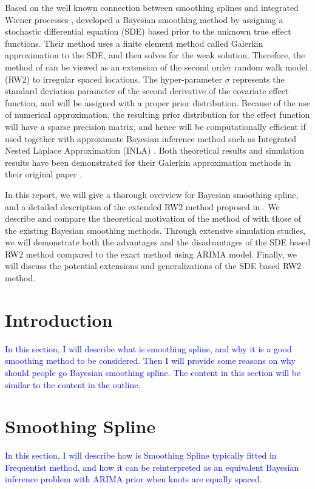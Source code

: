 \documentclass{article}
\newcommand{\ziang}{\textcolor{blue}}
\begin{document}
Based on the well known connection between smoothing splines and integrated Wiener processes \citep{wahba}, \cite{rw2} developed a Bayesian smoothing method by assigning a stochastic differential equation (SDE) based prior to the unknown true effect functions. 
Their method uses a finite element method called Galerkin approximation to the SDE, and then solves for the weak solution. Therefore, the method of \cite{inla} can be viewed as an extension of the second order random walk model (RW2) to irregular spaced locations.
The hyper-parameter $\sigma$ represents the standard deviation parameter of the second derivative of the covariate effect function, and will be assigned with a proper prior distribution. Because of the use of numerical approximation, the resulting prior distribution for the effect function will have a sparse precision matrix, and hence will be computationally efficient if used together with approximate Bayesian inference method such as Integrated Nested Laplace Approximation (INLA) \citep{inla}. Both theoretical results and simulation results have been demonstrated for their Galerkin approximation methods in their original paper \citep{rw2}.


In this report, we will give a thorough overview for Bayesian smoothing spline, and a detailed description of the extended RW2 method proposed in \cite{rw2}. We describe and compare the theoretical motivation of the method of \cite{rw2} with those of the existing Bayesian smoothing methods. Through extensive simulation studies, we will demonstrate both the advantages and the disadvantages of the SDE based RW2 method compared to the exact method using ARIMA \citep{ARIMA} model. Finally, we will discuss the potential extensions and generalizations of the SDE based RW2 method.

\section{Introduction}
\ziang{In this section, I will describe what is smoothing spline, and why it is a good smoothing method to be considered. Then I will provide some reasons on why should people go Bayesian smoothing spline. The content in this section will be similar to the content in the outline.}
\section{Smoothing Spline}
\ziang{In this section, I will describe how is Smoothing Spline typically fitted in Frequentist method, and how it can be reinterpreted as an equivalent Bayesian inference problem with ARIMA prior when knots are equally spaced. }
\end{document}
